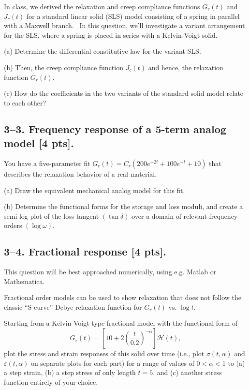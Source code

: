 \documentclass[preprint,12pt,authoryear]{elsarticle}
\begin{document}
In class, we derived the relaxation and creep compliance functions $G_r(t)$ and $J_c(t)$ for a standard linear solid (SLS) model consisting of a spring in parallel with a Maxwell branch. 
In this question, we'll investigate a variant arrangement for the SLS, where a spring is placed in series with a Kelvin-Voigt solid. 

(a) Determine the differential constitutive law for the variant SLS. 

(b) Then, the creep compliance function $J_c(t)$ and hence, the relaxation function $G_r(t)$.

(c) How do the coefficients in the two variants of the standard solid model relate to each other?

\bigskip
\bigskip
\bigskip
\subsection*{3--3. \textbf{Frequency response of a 5-term analog model} [4 pts].}
You have a five-parameter fit $G_r(t) = C_r (200 e^{-2t} + 100 e^{-t} + 10)$ that describes the relaxation behavior of a real material. 

(a) Draw the equivalent mechanical analog model for this fit.

(b) Determine the functional forms for the storage and loss moduli, and create a semi-log plot of the loss tangent $(\tan\delta)$ over a domain of relevant frequency orders $(\log \omega)$. 

\newpage
\subsection*{3--4. \textbf{Fractional response} [4 pts].}

This question will be best approached numerically, using e.g. Matlab or Mathematica. 

Fractional order models can be used to show relaxation that does not follow the classic ``S-curve'' Debye relaxation function for $G_r(t)$ vs. $\log t$. 

Starting from a Kelvin-Voigt-type fractional model with the functional form of 
\begin{equation*}
    G_r(t) = \left[10 + 2\left(\frac{t}{0.2} \right)^{-\alpha}\right] \mathcal{H}(t),
\end{equation*}
plot the stress and strain responses of this solid over time (i.e., plot $\sigma(t,\alpha)$ and $\varepsilon(t,\alpha)$ on separate plots for each part) for a range of values of $0<\alpha<1$ to (a) a step strain, (b) a step stress of only length $t=5$, and (c) another stress function entirely of your choice. 
\end{document}
